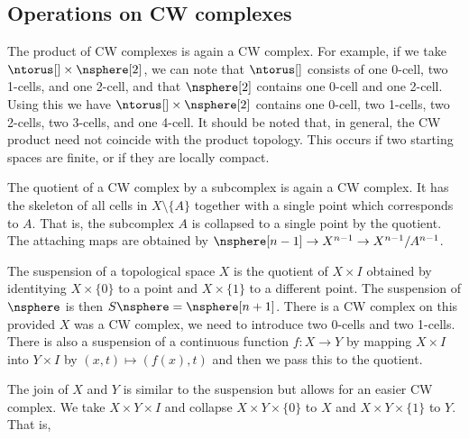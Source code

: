 \documentclass{book}                                                           %
\begin{document}
            \subsection{Operations on CW complexes}
                The product of CW complexes is again a CW complex. For example,
                if we take $\ntorus[]\times\nsphere[2]$, we can note that
                $\ntorus[]$ consists of one 0-cell, two 1-cells, and one 2-cell,
                and that $\nsphere[2]$ contains one 0-cell and one 2-cell. Using
                this we have $\ntorus[]\times\nsphere[2]$ contains
                one 0-cell, two 1-cells, two 2-cells, two 3-cells, and one
                4-cell. It should be noted that, in general, the CW product need
                not coincide with the product topology. This occurs if two
                starting spaces are finite, or if they are locally compact.
                \par\hfill\par
                The quotient of a CW complex by a subcomplex is again a CW
                complex. It has the skeleton of all cells in $X\setminus\{A\}$
                together with a single point which corresponds to $A$. That is,
                the subcomplex $A$ is collapsed to a single point by the
                quotient. The attaching maps are obtained by
                $\nsphere[n-1]\rightarrow{X}^{n-1}\rightarrow{X}^{n-1}/A^{n-1}$.
                \par\hfill\par
                The suspension of a topological space $X$ is the quotient of
                $X\times{I}$ obtained by identitying $X\times\{0\}$ to a point
                and $X\times\{1\}$ to a different point. The suspension of
                $\nsphere$ is then $S\nsphere=\nsphere[n+1]$. There is a CW
                complex on this provided $X$ was a CW complex, we need to
                introduce two 0-cells and two 1-cells. There is also a
                suspension of a continuous function $f:X\rightarrow{Y}$ by
                mapping $X\times{I}$ into $Y\times{I}$ by
                $(x,t)\mapsto(f(x),t)$ and then we pass this to the quotient.
                \par\hfill\par
                The join of $X$ and $Y$ is similar to the suspension but allows
                for an easier CW complex. We take $X\times{Y}\times{I}$ and
                collapse $X\times{Y}\times\{0\}$ to $X$ and
                $X\times{Y}\times\{1\}$ to $Y$. That is,
\end{document}

